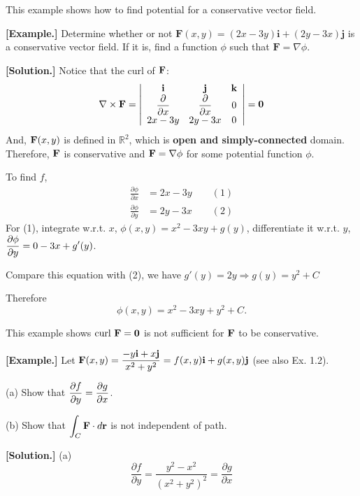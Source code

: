 \documentclass[11pt, a4paper]{MATH2023}
\newcommand{\eg}{\textbf{[Example.] }}
\newcommand{\sol}{\textbf{[Solution.] }}
\newcommand{\ii}{{\bf i}}
\newcommand{\jj}{{\bf j}}
\newcommand{\kk}{{\bf k}}
\newcommand{\FF}{{\bf F}}
\newcommand{\curl}{{\rm curl\ }}
\newcommand{\pt}{\partial}
\begin{document}
\begin{spacing}{1.3}
    {\blue This example shows how to find potential for a conservative vector field.}

    \eg Determine whether or not $\mathbf{F}(x, y)=(2 x-3 y) \mathbf{i}+(2 y-3 x) \mathbf{j}$ 
    is a conservative vector field. If it is, find a function $\phi$ such that $\mathbf{F}=\nabla \phi$.

    \sol Notice that the curl of $\FF$:
    $$\nabla \times \FF=\left|\begin{array}{ccc}
        \ii & \jj & \kk \\
        \dfrac{\pt}{\pt x} & \dfrac{\pt}{\pt x} & 0\\
        2x-3y & 2y-3x & 0
    \end{array} \right|={\bf 0}$$
    And, $\FF(x,y)$ is defined in $\mathbb{R}^2$, which is {\bf open and simply-connected} domain.
    Therefore, $\FF$ is conservative and $\FF=\nabla \phi$ for some potential function $\phi$.

    To find $f$,
    \begin{align*}
        \frac{\pt \phi}{\pt x} &= 2x-3y\qquad (1)\\
        \frac{\pt \phi}{\pt y} &= 2y-3x\qquad (2)
    \end{align*}
    For (1), integrate w.r.t. $x$, $\phi(x,y)=x^2-3xy+g(y)$, differentiate it w.r.t. $y$,
    $\disp \frac{\pt \phi}{\pt y}=0-3x+g'(y)$.

    Compare this equation with (2), we have $g'(y)=2y \Rightarrow g(y)=y^2+C$

    Therefore $$\phi(x, y)=x^2-3xy+y^2+C.$$

    \newpage
    {\blue This example shows $\curl \FF={\bf 0}$ is not sufficient for $\FF$ to be conservative.}

    \eg Let $\displaystyle \mathbf{F}(x, y)=\frac{-y \mathbf{i}+x \mathbf{j}}{x^{2}+y^{2}}=f(x, y) \mathbf{i}+g(x, y) \mathbf{j}$ (see also Ex. 1.2).
    
    (a) Show that $\displaystyle \frac{\partial f}{\partial y}=\frac{\partial g}{\partial x}$.

    (b) Show that $\displaystyle \int_{C} \mathbf{F} \cdot d \mathbf{r}$ is not independent of path.
    
    \sol (a)$$\frac{\partial f}{\partial y}=\frac{y^{2}-x^{2}}{\left(x^{2}+y^{2}\right)^{2}}=\frac{\partial g}{\partial x}$$


\end{spacing}
\end{document}
